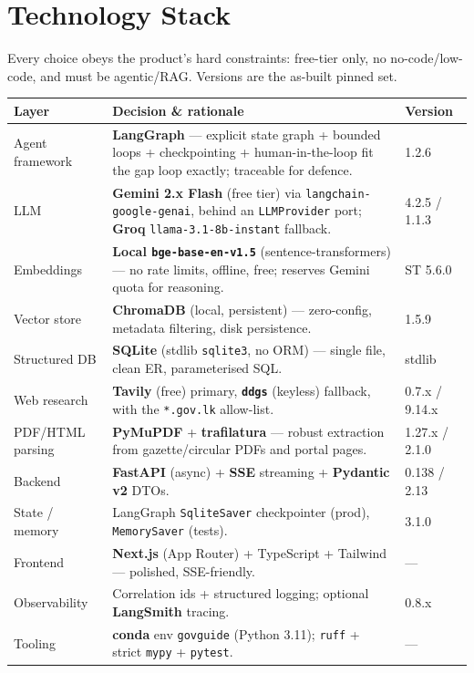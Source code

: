 \documentclass[11pt,a4paper]{article}
\begin{document}
\section{Technology Stack}
\label{sec:stack}

Every choice obeys the product's hard constraints: free-tier only, no no-code/low-code, and must be
agentic/RAG. Versions are the as-built pinned set.

{\footnotesize
\begin{xltabular}{\linewidth}{@{}l Y l@{}}
\toprule
\textbf{Layer} & \textbf{Decision \& rationale} & \textbf{Version} \\
\midrule
\endhead
Agent framework & \textbf{LangGraph} --- explicit state graph + bounded loops + checkpointing +
human-in-the-loop fit the gap loop exactly; traceable for defence. & 1.2.6 \\
LLM & \textbf{Gemini 2.x Flash} (free tier) via \texttt{langchain-google-genai}, behind an
\texttt{LLMProvider} port; \textbf{Groq} \texttt{llama-3.1-8b-instant} fallback. & 4.2.5 / 1.1.3 \\
Embeddings & \textbf{Local \texttt{bge-base-en-v1.5}} (sentence-transformers) --- no rate limits,
offline, free; reserves Gemini quota for reasoning. & ST 5.6.0 \\
Vector store & \textbf{ChromaDB} (local, persistent) --- zero-config, metadata filtering, disk
persistence. & 1.5.9 \\
Structured DB & \textbf{SQLite} (stdlib \texttt{sqlite3}, no ORM) --- single file, clean ER,
parameterised SQL. & stdlib \\
Web research & \textbf{Tavily} (free) primary, \textbf{\texttt{ddgs}} (keyless) fallback, with the
\texttt{*.gov.lk} allow-list. & 0.7.x / 9.14.x \\
PDF/HTML parsing & \textbf{PyMuPDF} + \textbf{trafilatura} --- robust extraction from
gazette/circular PDFs and portal pages. & 1.27.x / 2.1.0 \\
Backend & \textbf{FastAPI} (async) + \textbf{SSE} streaming + \textbf{Pydantic v2} DTOs. & 0.138 / 2.13 \\
State / memory & LangGraph \texttt{SqliteSaver} checkpointer (prod), \texttt{MemorySaver} (tests). &
3.1.0 \\
Frontend & \textbf{Next.js} (App Router) + TypeScript + Tailwind --- polished, SSE-friendly. & --- \\
Observability & Correlation ids + structured logging; optional \textbf{LangSmith} tracing. & 0.8.x \\
Tooling & \textbf{conda} env \texttt{govguide} (Python 3.11); \texttt{ruff} + strict \texttt{mypy} +
\texttt{pytest}. & --- \\
\bottomrule
\end{xltabular}}
\end{document}
